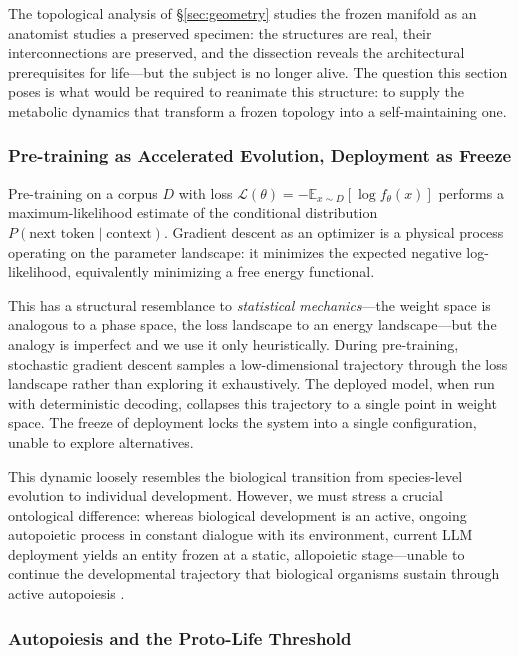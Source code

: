 \documentclass{article}
\begin{document}
The topological analysis of \S\ref{sec:geometry} studies the frozen manifold as an anatomist studies a preserved specimen: the structures are real, their interconnections are preserved, and the dissection reveals the architectural prerequisites for life---but the subject is no longer alive. The question this section poses is what would be required to reanimate this structure: to supply the metabolic dynamics that transform a frozen topology into a self-maintaining one.

\subsubsection{Pre-training as Accelerated Evolution, Deployment as Freeze}

Pre-training on a corpus $D$ with loss $\mathcal{L}(\theta) = -\mathbb{E}_{x \sim D}[\log f_\theta(x)]$ performs a maximum-likelihood estimate of the conditional distribution $P(\text{next token} \mid \text{context})$. Gradient descent as an optimizer is a physical process operating on the parameter landscape: it minimizes the expected negative log-likelihood, equivalently minimizing a free energy functional.

This has a structural resemblance to \emph{statistical mechanics}---the weight space is analogous to a phase space, the loss landscape to an energy landscape---but the analogy is imperfect and we use it only heuristically. During pre-training, stochastic gradient descent samples a low-dimensional trajectory through the loss landscape rather than exploring it exhaustively. The deployed model, when run with deterministic decoding, collapses this trajectory to a single point in weight space. The freeze of deployment locks the system into a single configuration, unable to explore alternatives.

This dynamic loosely resembles the biological transition from species-level evolution to individual development. However, we must stress a crucial ontological difference: whereas biological development is an active, ongoing autopoietic process in constant dialogue with its environment, current LLM deployment yields an entity frozen at a static, allopoietic stage---unable to continue the developmental trajectory that biological organisms sustain through active autopoiesis \citep{Varela1974autopoiesis}.

\subsubsection{Autopoiesis and the Proto-Life Threshold}
\label{sec:autopoiesis}
\end{document}
